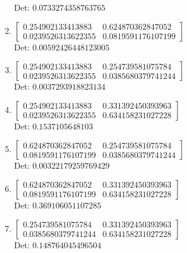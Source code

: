 \documentclass[12pt]{article}
\begin{document}
\begin{enumerate}
Det: $0.0733274358763765$\\

\item $\displaystyle \left[\begin{matrix}0.254902133413883 & 0.624870362847052\\0.0239526313622355 & 0.0819591176107199\end{matrix}\right]$\\

Det: $0.00592426448123005$\\

\item $\displaystyle \left[\begin{matrix}0.254902133413883 & 0.254739581075784\\0.0239526313622355 & 0.0385680379741244\end{matrix}\right]$\\

Det: $0.0037293918823134$\\

\item $\displaystyle \left[\begin{matrix}0.254902133413883 & 0.331392450393963\\0.0239526313622355 & 0.634158231027228\end{matrix}\right]$\\

Det: $0.1537105648103$\\

\item $\displaystyle \left[\begin{matrix}0.624870362847052 & 0.254739581075784\\0.0819591176107199 & 0.0385680379741244\end{matrix}\right]$\\

Det: $0.00322179259769429$\\

\item $\displaystyle \left[\begin{matrix}0.624870362847052 & 0.331392450393963\\0.0819591176107199 & 0.634158231027228\end{matrix}\right]$\\

Det: $0.369106051107285$\\

\item $\displaystyle \left[\begin{matrix}0.254739581075784 & 0.331392450393963\\0.0385680379741244 & 0.634158231027228\end{matrix}\right]$\\

Det: $0.148764045496504$\\

\end{enumerate}
\end{document}
